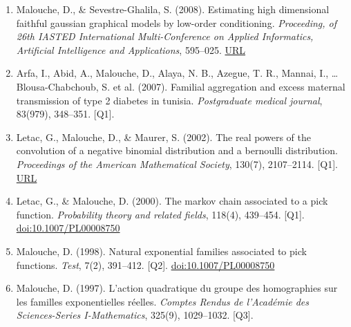\documentclass[11pt,a4paper,sans]{moderncv}
\begin{document}
\begin{enumerate}
\item Malouche, D., \& Sevestre-Ghalila, S. (2008). Estimating high dimensional faithful gaussian graphical models by low-order conditioning. \textit{Proceeding, of 26th IASTED International Multi-Conference on Applied Informatics, Artificial Intelligence and Applications}, 595–025. \href{http://citeseerx.ist.psu.edu/viewdoc/summary?doi=10.1.1.246.9608}{URL}
\item Arfa, I., Abid, A., Malouche, D., Alaya, N. B., Azegue, T. R., Mannai, I., \ldots Blousa-Chabchoub, S. et al. (2007). Familial aggregation and excess maternal transmission of type 2 diabetes in tunisia. \textit{Postgraduate medical journal}, 83(979), 348–351. [Q1].
\item Letac, G., Malouche, D., \& Maurer, S. (2002). The real powers of the convolution of a negative binomial distribution and a bernoulli distribution. \textit{Proceedings of the American Mathematical Society}, 130(7), 2107–2114. [Q1]. \href{https://www.ams.org/journals/proc/2002-130-07/S0002-9939-02-05352-2/}{URL}
\item Letac, G., \& Malouche, D. (2000). The markov chain associated to a pick function. \textit{Probability theory and related fields}, 118(4), 439–454. [Q1]. \href{https://link.springer.com/article/10.1007/PL00008750}{doi:10.1007/PL00008750}
\item Malouche, D. (1998). Natural exponential families associated to pick functions. \textit{Test}, 7(2), 391–412. [Q2]. \href{https://doi.org/10.1007/PL00008750}{doi:10.1007/PL00008750}
\item Malouche, D. (1997). L'action quadratique du groupe des homographies sur les familles exponentielles réelles. \textit{Comptes Rendus de l'Académie des Sciences-Series I-Mathematics}, 325(9), 1029–1032. [Q3].
\end{enumerate}
\end{document}
